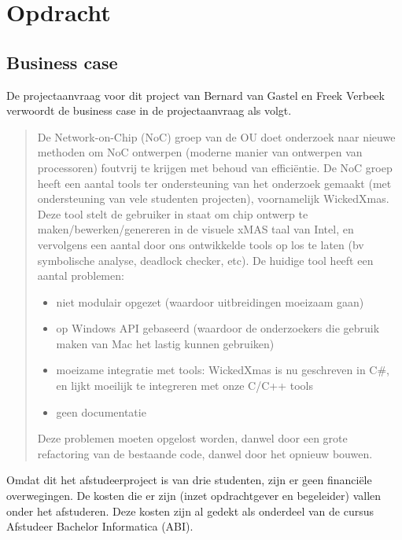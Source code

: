 
\section{Opdracht}

\subsection{Business case}

De projectaanvraag voor dit project van Bernard van Gastel en
Freek Verbeek verwoordt de business case in de projectaanvraag
als volgt.

\begin{quote}
    \tiny
    De Network-on-Chip (NoC) groep van de OU doet onderzoek
    naar nieuwe methoden om NoC ontwerpen (moderne manier van
    ontwerpen van processoren) foutvrij te krijgen met behoud van
    efficiëntie. De NoC groep heeft een aantal tools ter ondersteuning
    van het onderzoek gemaakt (met ondersteuning van vele studenten
    projecten), voornamelijk WickedXmas. Deze tool stelt de
    gebruiker in staat om chip ontwerp te maken/bewerken/genereren
    in de visuele xMAS taal van Intel, en vervolgens een aantal door
    ons ontwikkelde tools op los te laten (bv symbolische analyse,
    deadlock checker, etc).
    De huidige tool heeft een aantal problemen:

    \begin{itemize}
	\item niet modulair opgezet (waardoor uitbreidingen moeizaam gaan)
	\item op Windows API gebaseerd (waardoor de onderzoekers die
	    gebruik maken van Mac het lastig kunnen gebruiken)
	\item moeizame integratie met tools: WickedXmas is nu geschreven
	    in C\#, en lijkt moeilijk te integreren met onze C/C++ tools
	\item geen documentatie
    \end{itemize}

    Deze problemen moeten opgelost worden, danwel door een grote
    refactoring van de bestaande code, danwel door het opnieuw
    bouwen.
\end{quote}

Omdat dit het afstudeerproject is van drie studenten, zijn er geen financi\"ele overwegingen.
De kosten die er zijn (inzet opdrachtgever en begeleider) vallen onder het afstuderen. Deze kosten
zijn al gedekt als onderdeel van de cursus Afstudeer Bachelor Informatica (ABI).

